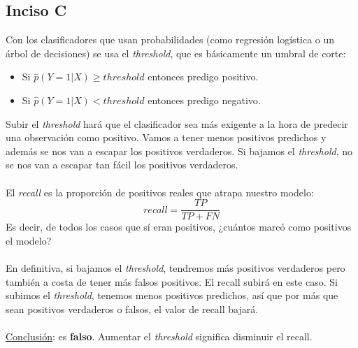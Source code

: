 \documentclass{article}
\begin{document}
        \subsection*{Inciso C}
            Con los clasificadores que usan probabilidades (como regresión logística o un árbol de decisiones) se usa el \textit{threshold}, que es básicamente un umbral de corte:
            \begin{itemize}
                \item Si $\hat{p}(Y=1 | X) \geq threshold$ entonces predigo positivo.
                \item Si $\hat{p}(Y=1 | X) < threshold$ entonces predigo negativo.
            \end{itemize}
            Subir el \textit{threshold} hará que el clasificador sea más exigente a la hora de predecir una observación como positivo. Vamos a tener menos positivos predichos y además se nos van a escapar los positivos verdaderos. Si bajamos el \textit{threshold}, no se nos van a escapar tan fácil los positivos verdaderos. \\
            \\
            El \textit{recall} es la proporción de positivos reales que atrapa nuestro modelo:
            \[ recall = \frac{TP}{TP+FN} \]
            Es decir, de todos los casos que sí eran positivos, ¿cuántos marcó como positivos el modelo? \\
            \\
            En definitiva, si bajamos el \textit{threshold}, tendremos más positivos verdaderos pero también a costa de tener más falsos positivos. El recall subirá en este caso. Si subimos el \textit{threshold}, tenemos menos positivos predichos, así que por más que sean positivos verdaderos o falsos, el valor de recall bajará. \\
            \\
            \underline{Conclusión}: es \textbf{falso}. Aumentar el \textit{threshold} significa disminuir el recall.
\end{document}
